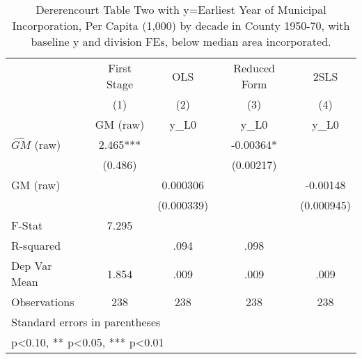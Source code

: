 \begin{table}[htbp]\centering
\def\sym#1{\ifmmode^{#1}\else\(^{#1}\)\fi}
\caption{Dererencourt Table Two with y=Earliest Year of Municipal Incorporation, Per Capita (1,000) by decade in County 1950-70, with baseline y and division FEs, below median area incorporated.}
\begin{tabular}{l*{4}{c}}
\toprule
                    & First Stage   &         OLS   &Reduced Form   &        2SLS   \\
                    &\multicolumn{1}{c}{(1)}&\multicolumn{1}{c}{(2)}&\multicolumn{1}{c}{(3)}&\multicolumn{1}{c}{(4)}\\
                    &\multicolumn{1}{c}{GM  (raw)}&\multicolumn{1}{c}{y\_L0}&\multicolumn{1}{c}{y\_L0}&\multicolumn{1}{c}{y\_L0}\\
\midrule
$\hat{GM}$ (raw)    &       2.465***&               &    -0.00364*  &               \\
                    &     (0.486)   &               &   (0.00217)   &               \\
\addlinespace
GM  (raw)           &               &    0.000306   &               &    -0.00148   \\
                    &               &  (0.000339)   &               &  (0.000945)   \\
\midrule
F-Stat              &       7.295   &               &               &               \\
R-squared           &               &        .094   &        .098   &               \\
Dep Var Mean        &       1.854   &        .009   &        .009   &        .009   \\
Observations        &         238   &         238   &         238   &         238   \\
\bottomrule
\multicolumn{5}{l}{\footnotesize Standard errors in parentheses}\\
\multicolumn{5}{l}{\footnotesize * p<0.10, ** p<0.05, *** p<0.01}\\
\end{tabular}
\end{table}
